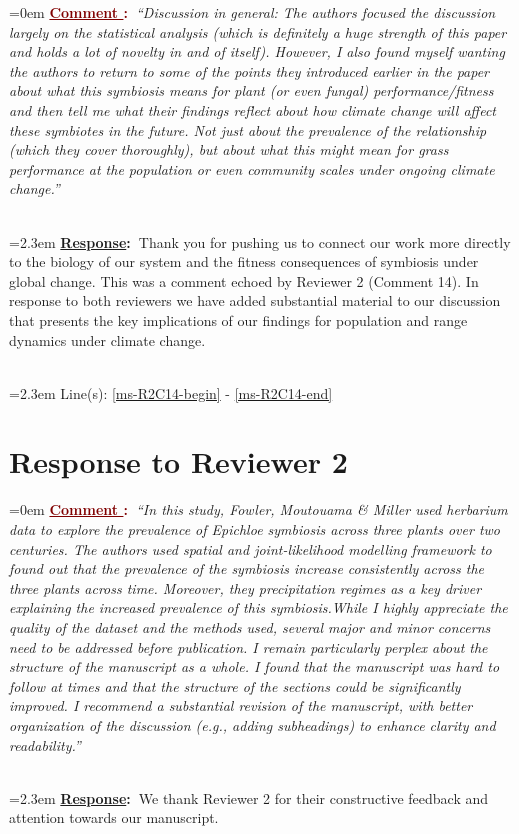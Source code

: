 \documentclass[12pt]{article}
\newcounter{cN}
\newcommand{\comment}[1]{
	\vspace{2em}
	\refstepcounter{cN} %
	\noindent \hangindent=0em \textbf{\textcolor{Maroon}{\uline{Comment \thecN}:~}}\emph{``#1''}
	}
\newcommand{\response}[1]{
	\\[0.25em]
	\hangindent=2.3em \textbf{\textcolor{NavyBlue}{\uline{Response}:~}}#1
	}
\newcommand{\linesref}[2]{
		\\[0.25em]
	\hangindent=2.3em {\color{Mahogany} Line(s): \ref{#1} - \ref{#2}}
}
\begin{document}
\comment{Discussion in general: The authors focused the discussion largely on the statistical analysis (which is definitely a huge strength of this paper and holds a lot of novelty in and of itself). However, I also found myself wanting the authors to return to some of the points they introduced earlier in the paper about what this symbiosis means for plant (or even fungal) performance/fitness and then tell me what their findings reflect about how climate change will affect these symbiotes in the future. Not just about the prevalence of the relationship (which they cover thoroughly), but about what this might mean for grass performance at the population or even community scales under ongoing climate change.}
\response{Thank you for pushing us to connect our work more directly to the biology of our system and the fitness consequences of symbiosis under global change. This was a comment echoed by Reviewer 2 (Comment 14). In response to both reviewers we have added substantial material to our discussion that presents the key implications of our findings for population and range dynamics under climate change.}
\linesref{ms-R2C14-begin}{ms-R2C14-end}


\section{Response to Reviewer 2}
\vspace{-2em}

\comment{In this study, Fowler, Moutouama \& Miller used herbarium data to explore the prevalence of Epichloe symbiosis across three plants over two centuries. The authors used spatial and joint-likelihood modelling framework to found out that the prevalence of the symbiosis increase consistently across the three plants across time. Moreover, they precipitation regimes as a key driver explaining the increased prevalence of this symbiosis.While I highly appreciate the quality of the dataset and the methods used, several major and minor concerns need to be addressed before publication. I remain particularly perplex about the structure of the manuscript as a whole. I found that the manuscript was hard to follow at times and that the structure of the sections could be significantly improved. I recommend a substantial revision of the manuscript, with better organization of the discussion (e.g., adding subheadings) to enhance clarity and readability.}
\response{We thank Reviewer 2 for their constructive feedback and attention towards our manuscript.}
\end{document}
